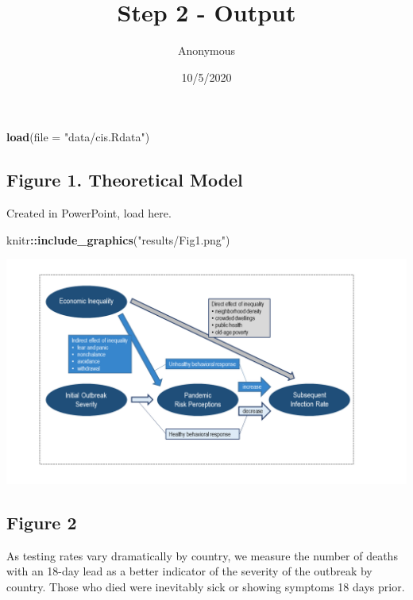\documentclass[
]{article}
\title{Step 2 - Output}
\author{Anonymous}
\date{10/5/2020}
\newenvironment{Shaded}{\begin{snugshade}}{\end{snugshade}}
\newcommand{\DataTypeTok}[1]{\textcolor[rgb]{0.13,0.29,0.53}{#1}}
\newcommand{\KeywordTok}[1]{\textcolor[rgb]{0.13,0.29,0.53}{\textbf{#1}}}
\newcommand{\NormalTok}[1]{#1}
\newcommand{\OperatorTok}[1]{\textcolor[rgb]{0.81,0.36,0.00}{\textbf{#1}}}
\newcommand{\StringTok}[1]{\textcolor[rgb]{0.31,0.60,0.02}{#1}}
\begin{document}
\maketitle

\begin{Shaded}
\begin{Highlighting}[]
\KeywordTok{load}\NormalTok{(}\DataTypeTok{file =} \StringTok{"data/cis.Rdata"}\NormalTok{)}
\end{Highlighting}
\end{Shaded}

\hypertarget{figure-1.-theoretical-model}{%
\subsection{Figure 1. Theoretical
Model}\label{figure-1.-theoretical-model}}

Created in PowerPoint, load here.

\begin{Shaded}
\begin{Highlighting}[]
\NormalTok{knitr}\OperatorTok{::}\KeywordTok{include_graphics}\NormalTok{(}\StringTok{"results/Fig1.png"}\NormalTok{)}
\end{Highlighting}
\end{Shaded}

\includegraphics[width=17.78in]{results/Fig1}

\hypertarget{figure-2}{%
\subsection{Figure 2}\label{figure-2}}

As testing rates vary dramatically by country, we measure the number of
deaths with an 18-day lead as a better indicator of the severity of the
outbreak by country. Those who died were inevitably sick or showing
symptoms 18 days prior.
\end{document}
